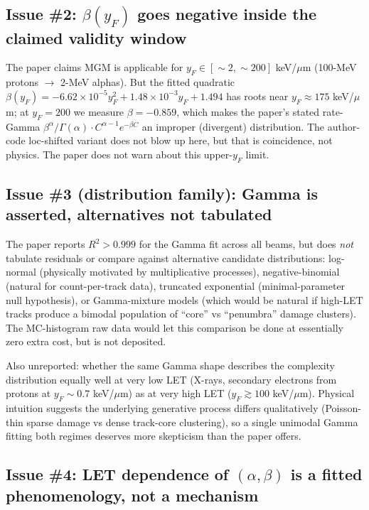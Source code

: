 \documentclass[11pt]{article}
\begin{document}
\subsection{Issue \#2: $\beta(y_F)$ goes negative inside the claimed validity window}

The paper claims MGM is applicable for $y_F \in [\sim 2, \sim 200]$ keV/$\mu$m
(100-MeV protons $\to$ 2-MeV alphas). But the fitted quadratic
$\beta(y_F) = -6.62 \times 10^{-5} y_F^2 + 1.48 \times 10^{-3} y_F + 1.494$
has roots near $y_F \approx 175$ keV/$\mu$m; at $y_F = 200$ we measure
$\beta = -0.859$, which makes the paper's stated rate-Gamma
$\beta^\alpha/\Gamma(\alpha) \cdot C^{\alpha-1} e^{-\beta C}$ an improper
(divergent) distribution. The author-code loc-shifted variant does not blow up
here, but that is coincidence, not physics. The paper does not warn about this
upper-$y_F$ limit.

\subsection{Issue \#3 (distribution family): Gamma is asserted, alternatives not tabulated}

The paper reports $R^2 > 0.999$ for the Gamma fit across all beams, but does
\emph{not} tabulate residuals or compare against alternative candidate
distributions: log-normal (physically motivated by multiplicative processes),
negative-binomial (natural for count-per-track data), truncated exponential
(minimal-parameter null hypothesis), or Gamma-mixture models (which would be
natural if high-LET tracks produce a bimodal population of ``core'' vs
``penumbra'' damage clusters). The MC-histogram raw data would let this
comparison be done at essentially zero extra cost, but is not deposited.

Also unreported: whether the same Gamma shape describes the complexity
distribution equally well at very low LET (X-rays, secondary electrons from
protons at $y_F \sim 0.7$ keV/$\mu$m) as at very high LET
($y_F \gtrsim 100$ keV/$\mu$m). Physical intuition suggests the underlying
generative process differs qualitatively (Poisson-thin sparse damage vs
dense track-core clustering), so a single unimodal Gamma fitting both
regimes deserves more skepticism than the paper offers.

\subsection{Issue \#4: LET dependence of $(\alpha, \beta)$ is a fitted phenomenology, not a mechanism}
\end{document}
